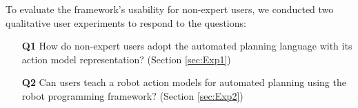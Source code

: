 
\label{sec:hypotheses}

To evaluate the framework's usability for non-expert users, %
we conducted two qualitative user experiments to respond to the questions:
\begin{enumerate}
  \item[\textbf{Q1}] How do non-expert users adopt the automated planning language with its action model representation? (Section \ref{sec:Exp1})
  \item[\textbf{Q2}] Can users teach a robot action models for automated planning using the robot programming framework? (Section \ref{sec:Exp2})
\end{enumerate}
